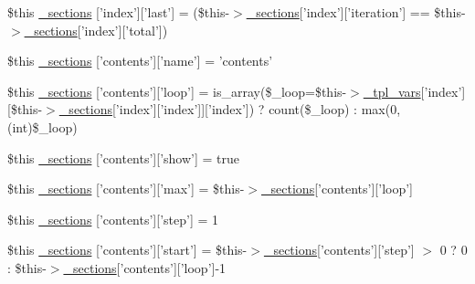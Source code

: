 \begin{DoxyCompactItemize}
\item 
\$this \hyperlink{34d6fa4bfd5eef6424a9ddc74a166350_2_06_06-19_05_06_06-1910644431_05basicindex_8tpl_8php_a21655935ac4f76e2eb1b4fc8f39a5f21}{\-\_\-sections} \mbox{[}'index'\mbox{]}\mbox{[}'last'\mbox{]} = (\$this-\/$>$\hyperlink{_06_06127_05_06_0612781687_05pkgelementindex_8tpl_8php_a9e3d26b39edfe29c3f29b8035ef33828}{\-\_\-sections}\mbox{[}'index'\mbox{]}\mbox{[}'iteration'\mbox{]} == \$this-\/$>$\hyperlink{_06_06127_05_06_0612781687_05pkgelementindex_8tpl_8php_a9e3d26b39edfe29c3f29b8035ef33828}{\-\_\-sections}\mbox{[}'index'\mbox{]}\mbox{[}'total'\mbox{]})
\item 
\$this \hyperlink{34d6fa4bfd5eef6424a9ddc74a166350_2_06_06-19_05_06_06-1910644431_05basicindex_8tpl_8php_a3589d4df5cd7702f429822ac946d6783}{\-\_\-sections} \mbox{[}'contents'\mbox{]}\mbox{[}'name'\mbox{]} = 'contents'
\item 
\$this \hyperlink{34d6fa4bfd5eef6424a9ddc74a166350_2_06_06-19_05_06_06-1910644431_05basicindex_8tpl_8php_ae8c055e6fcc9126501d6e4442fb1e53a}{\-\_\-sections} \mbox{[}'contents'\mbox{]}\mbox{[}'loop'\mbox{]} = is\-\_\-array(\$\-\_\-loop=\$this-\/$>$\hyperlink{_06_06127_05_06_0612781687_05pkgelementindex_8tpl_8php_a4a4846d8e68d455590131a05697f67a3}{\-\_\-tpl\-\_\-vars}\mbox{[}'index'\mbox{]}\mbox{[}\$this-\/$>$\hyperlink{_06_06127_05_06_0612781687_05pkgelementindex_8tpl_8php_a9e3d26b39edfe29c3f29b8035ef33828}{\-\_\-sections}\mbox{[}'index'\mbox{]}\mbox{[}'index'\mbox{]}\mbox{]}\mbox{[}'index'\mbox{]}) ? count(\$\-\_\-loop) \-: max(0, (int)\$\-\_\-loop)
\item 
\$this \hyperlink{34d6fa4bfd5eef6424a9ddc74a166350_2_06_06-19_05_06_06-1910644431_05basicindex_8tpl_8php_a014a817ed19b339bd5ee1357b80ca8c7}{\-\_\-sections} \mbox{[}'contents'\mbox{]}\mbox{[}'show'\mbox{]} = true
\item 
\$this \hyperlink{34d6fa4bfd5eef6424a9ddc74a166350_2_06_06-19_05_06_06-1910644431_05basicindex_8tpl_8php_a199328578f46d74cad5394c8b3eef3df}{\-\_\-sections} \mbox{[}'contents'\mbox{]}\mbox{[}'max'\mbox{]} = \$this-\/$>$\hyperlink{_06_06127_05_06_0612781687_05pkgelementindex_8tpl_8php_a9e3d26b39edfe29c3f29b8035ef33828}{\-\_\-sections}\mbox{[}'contents'\mbox{]}\mbox{[}'loop'\mbox{]}
\item 
\$this \hyperlink{34d6fa4bfd5eef6424a9ddc74a166350_2_06_06-19_05_06_06-1910644431_05basicindex_8tpl_8php_aed58e295ff6fc74cbb3029d59396c219}{\-\_\-sections} \mbox{[}'contents'\mbox{]}\mbox{[}'step'\mbox{]} = 1
\item 
\$this \hyperlink{34d6fa4bfd5eef6424a9ddc74a166350_2_06_06-19_05_06_06-1910644431_05basicindex_8tpl_8php_aafe683c602549524f185f2520f03b171}{\-\_\-sections} \mbox{[}'contents'\mbox{]}\mbox{[}'start'\mbox{]} = \$this-\/$>$\hyperlink{_06_06127_05_06_0612781687_05pkgelementindex_8tpl_8php_a9e3d26b39edfe29c3f29b8035ef33828}{\-\_\-sections}\mbox{[}'contents'\mbox{]}\mbox{[}'step'\mbox{]} $>$ 0 ? 0 \-: \$this-\/$>$\hyperlink{_06_06127_05_06_0612781687_05pkgelementindex_8tpl_8php_a9e3d26b39edfe29c3f29b8035ef33828}{\-\_\-sections}\mbox{[}'contents'\mbox{]}\mbox{[}'loop'\mbox{]}-\/1

\end{DoxyCompactItemize}

